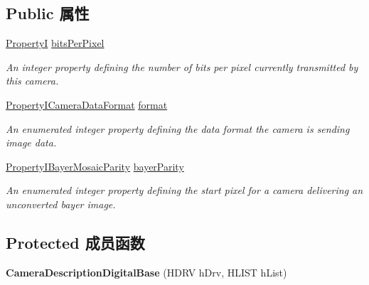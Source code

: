 \subsection*{Public 属性}
\begin{DoxyCompactItemize}
\item 
\hypertarget{classmv_i_m_p_a_c_t_1_1acquire_1_1_camera_description_digital_base_a271cad4ec696beae5e22b607c4509f9c}{\hyperlink{group___common_interface_ga12d5e434238ca242a1ba4c6c3ea45780}{Property\+I} \hyperlink{classmv_i_m_p_a_c_t_1_1acquire_1_1_camera_description_digital_base_a271cad4ec696beae5e22b607c4509f9c}{bits\+Per\+Pixel}}\label{classmv_i_m_p_a_c_t_1_1acquire_1_1_camera_description_digital_base_a271cad4ec696beae5e22b607c4509f9c}

\begin{DoxyCompactList}\small\item\em An integer property defining the number of bits per pixel currently transmitted by this camera. \end{DoxyCompactList}\item 
\hyperlink{group___device_specific_interface_gaca0c18e83412eef14a2be9fdc89066b6}{Property\+I\+Camera\+Data\+Format} \hyperlink{classmv_i_m_p_a_c_t_1_1acquire_1_1_camera_description_digital_base_a06cbe37a9a07831b908c66df54026fc5}{format}
\begin{DoxyCompactList}\small\item\em An enumerated integer property defining the data format the camera is sending image data. \end{DoxyCompactList}\item 
\hyperlink{group___common_interface_gafaa3668c30761b139d7ff110ac2c83e4}{Property\+I\+Bayer\+Mosaic\+Parity} \hyperlink{classmv_i_m_p_a_c_t_1_1acquire_1_1_camera_description_digital_base_a3559cea18f8846eb4618a762aa615b25}{bayer\+Parity}
\begin{DoxyCompactList}\small\item\em An enumerated integer property defining the start pixel for a camera delivering an unconverted bayer image. \end{DoxyCompactList}\end{DoxyCompactItemize}
\subsection*{Protected 成员函数}
\begin{DoxyCompactItemize}
\item 
\hypertarget{classmv_i_m_p_a_c_t_1_1acquire_1_1_camera_description_digital_base_ad8070846779e0062a17e436eb60951dc}{{\bfseries Camera\+Description\+Digital\+Base} (H\+D\+R\+V h\+Drv, H\+L\+I\+S\+T h\+List)}\label{classmv_i_m_p_a_c_t_1_1acquire_1_1_camera_description_digital_base_ad8070846779e0062a17e436eb60951dc}

\end{DoxyCompactItemize}
